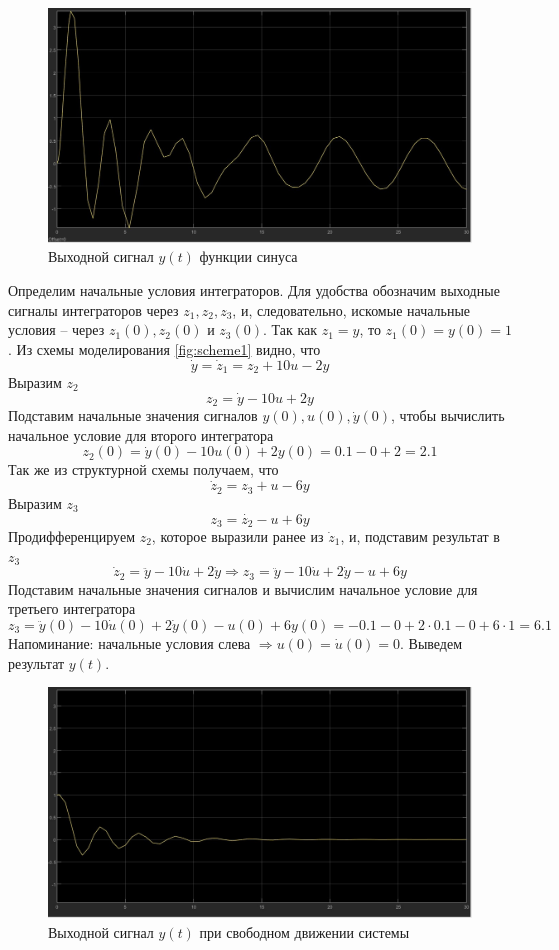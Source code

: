 \documentclass[a4paper, 12pt]{article}
\begin{document}
    \begin{figure}[H]
        \centering
        \includegraphics[scale=0.3]{sin_y.jpg}
        \captionsetup{skip=0pt}
        \caption{Выходной сигнал $y(t)$ функции синуса}
        \label{fig:siny}
    \end{figure}

   
    \newpage
    Определим начальные условия интеграторов. Для удобства обозначим выходные сигналы интеграторов
    через $z_1,z_2,z_3$, и, следовательно, искомые начальные условия -- через $z_1(0),z_2(0)$ и $z_3(0)$.
    Так как $z_1=y$, то $z_1(0)=y(0)=1$. Из схемы моделирования \ref{fig:scheme1} видно, что 
    $$\dot{y}=\dot{z}_1=z_2+10u-2y$$
    Выразим $z_2$
    $$z_2=\dot{y}-10u+2y$$
    Подставим начальные значения сигналов $y(0),u(0),\dot{y}(0)$, чтобы вычислить начальное условие для
    второго интегратора
    $$z_2(0)=\dot{y}(0)-10u(0)+2y(0)=0.1-0+2=2.1$$
    Так же из структурной схемы получаем, что
    $$\dot{z}_2=z_3+u-6y$$
    Выразим $z_3$
    $$z_3=\dot{z_2}-u+6y$$
    Продифференцируем $z_2$, которое выразили ранее из $\dot{z}_1$, и, подставим результат в $z_3$
    $$\dot{z}_2=\ddot{y}-10\dot{u}+2\dot{y}\Rightarrow z_3=\ddot{y}-10\dot{u}+2\dot{y}-u+6y$$
    Подставим начальные значения сигналов и вычислим начальное условие для третьего интегратора
    $$z_3=\ddot{y}(0)-10\dot{u}(0)+2\dot{y}(0)-u(0)+6y(0)=-0.1-0+2\cdot0.1-0+6\cdot1=6.1$$
    Напоминание: начальные условия слева $\Rightarrow u(0)=\dot{u}(0)=0$. Выведем результат $y(t)$.
    \begin{figure}[H]
        \centering
        \includegraphics[scale=0.3]{null_y.jpg}
        \captionsetup{skip=0pt}
        \caption{Выходной сигнал $y(t)$ при свободном движении системы}
        \label{fig:null_y}
    \end{figure}
\end{document}
